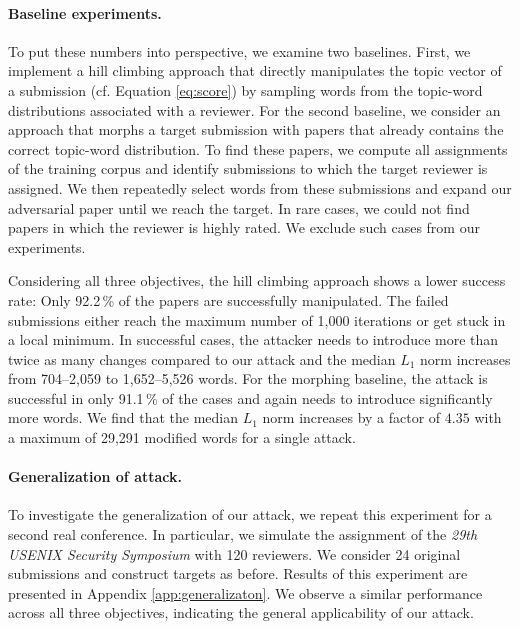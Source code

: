 \documentclass[letterpaper,twocolumn,10pt]{article}
\begin{document}
\paragraph{Baseline experiments.} To put these numbers into perspective, we examine two baselines. 
First, we implement a hill climbing approach that directly manipulates the topic vector of a submission (cf. Equation \ref{eq:score}) by sampling words from the topic-word distributions associated with a reviewer.
For the second baseline, we consider an approach that morphs a target submission with papers that already contains the correct topic-word distribution. 
To find these papers, we compute all assignments of the training corpus and identify submissions to which the target reviewer is assigned. We then repeatedly select words from these submissions and expand our adversarial paper until we reach the target. In rare cases, we could not find papers in which the reviewer is highly rated. We exclude such cases from our experiments.

Considering all three objectives, the hill climbing approach shows a lower success rate: Only 92.2\,\% of the papers are successfully manipulated. The failed submissions either reach the maximum number of 1,000 iterations or get stuck in a local minimum. In successful cases, the attacker needs to introduce more than twice as many changes compared to our attack and the median $L_1$ norm increases from 704--2,059 to 1,652--5,526 words. For the morphing baseline, the attack is successful in only 91.1\,\% of the cases and again needs to introduce significantly more words. We find that the median $L_1$ norm increases by a factor of $4.35$ with a maximum of 29,291 modified words for a single attack.

\paragraph{Generalization of attack.} 
To investigate the generalization of our attack, we repeat this experiment for a second real conference. In particular, we simulate the assignment of the \emph{29th USENIX Security Symposium} with 120 reviewers. We consider 24 original submissions and construct targets as before. Results of this experiment are presented in Appendix \ref{app:generalizaton}.
We observe a similar performance across all three objectives, indicating the general applicability of our attack.
\end{document}
